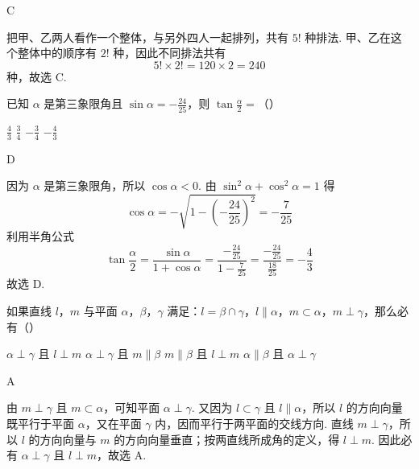 \documentclass[UTF8,a4paper,oneside,11pt]{ctexbook}
\begin{document}
\begin{answer}
C
\end{answer}

\begin{solution}
把甲、乙两人看作一个整体，与另外四人一起排列，共有 \(5!\) 种排法. 甲、乙在这个整体中的顺序有 \(2!\) 种，因此不同排法共有
\[
5!\times2!=120\times2=240
\]
种，故选 C.
\end{solution}

\begin{problem}
已知 \(\alpha\) 是第三象限角且 \(\sin \alpha = -\frac{24}{25}\)，则 \(\tan \frac{\alpha}{2} =\)（\quad）

\choices
    {\(\frac{4}{3}\)}
    {\(\frac{3}{4}\)}
    {\(-\frac{3}{4}\)}
    {\(-\frac{4}{3}\)}
\end{problem}

\begin{answer}
D
\end{answer}

\begin{solution}
因为 \(\alpha\) 是第三象限角，所以 \(\cos\alpha<0\). 由 \(\sin^2\alpha+\cos^2\alpha=1\) 得
\[
\cos\alpha=-\sqrt{1-\left(-\frac{24}{25}\right)^2}=-\frac{7}{25}
\]
利用半角公式
\[
\tan\frac{\alpha}{2}=\frac{\sin\alpha}{1+\cos\alpha}
=\frac{-\frac{24}{25}}{1-\frac{7}{25}}
=\frac{-\frac{24}{25}}{\frac{18}{25}}=-\frac{4}{3}
\]
故选 D.
\end{solution}

\begin{problem}
如果直线 \(l\)，\(m\) 与平面 \(\alpha\)，\(\beta\)，\(\gamma\) 满足：\(l = \beta \cap \gamma\)，\(l \parallel \alpha\)，\(m \subset \alpha\)，\(m \perp \gamma\)，那么必有（\quad）

\choices
    {\(\alpha \perp \gamma\) 且 \(l \perp m\)}
    {\(\alpha \perp \gamma\) 且 \(m \parallel \beta\)}
    {\(m \parallel \beta\) 且 \(l \perp m\)}
    {\(\alpha \parallel \beta\) 且 \(\alpha \perp \gamma\)}
\end{problem}

\begin{answer}
A
\end{answer}

\begin{solution}
由 \(m\perp\gamma\) 且 \(m\subset\alpha\)，可知平面 \(\alpha\perp\gamma\). 又因为 \(l\subset\gamma\) 且 \(l\parallel\alpha\)，所以 \(l\) 的方向向量既平行于平面 \(\alpha\)，又在平面 \(\gamma\) 内，因而平行于两平面的交线方向. 直线 \(m\perp\gamma\)，所以 \(l\) 的方向向量与 \(m\) 的方向向量垂直；按两直线所成角的定义，得 \(l\perp m\). 因此必有 \(\alpha\perp\gamma\) 且 \(l\perp m\)，故选 A.
\end{solution}
\end{document}

